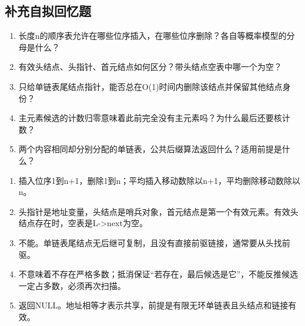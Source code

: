 \subsection{补充自拟回忆题}\label{DS02-recall-extra}

\begin{recallcard}[从边界恢复算法]

\begin{enumerate}
\def\labelenumi{\arabic{enumi}.}
\setcounter{enumi}{3}
\tightlist
\item
  长度n的顺序表允许在哪些位序插入，在哪些位序删除？各自等概率模型的分母是什么？
\item
  有效头结点、头指针、首元结点如何区分？带头结点空表中哪一个为空？
\item
  只给单链表尾结点指针，能否总在O(1)时间内删除该结点并保留其他结点身份？
\item
  主元素候选的计数归零意味着此前完全没有主元素吗？为什么最后还要核计数？
\item
  两个内容相同却分别分配的单链表，公共后缀算法返回什么？适用前提是什么？
\end{enumerate}

\end{recallcard}

\begin{solution}[补充题核对答案]

\begin{enumerate}
\def\labelenumi{\arabic{enumi}.}
\setcounter{enumi}{3}
\tightlist
\item
  插入位序1到n+1，删除1到n；平均插入移动数除以n+1，平均删除移动数除以n。
\item
  头指针是地址变量，头结点是哨兵对象，首元结点是第一个有效元素。有效头结点存在时，空表是L-\textgreater next为空。
\item
  不能。单链表尾结点无后继可复制，且没有直接前驱链接，通常要从头找前驱。
\item
  不意味着不存在严格多数；抵消保证``若存在，最后候选是它''，不能反推候选一定占多数，必须再次扫描。
\item
  返回NULL。地址相等才表示共享，前提是有限无环单链表且头结点和链接有效。
\end{enumerate}

\end{solution}
